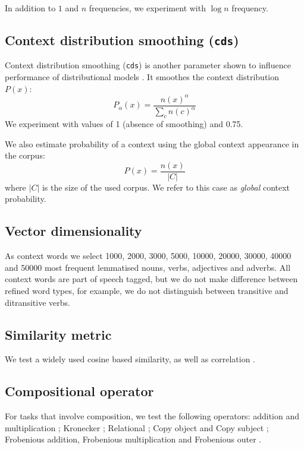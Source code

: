 \documentclass[11pt,letterpaper]{article}
\begin{document}
In addition to $1$ and $n$ frequencies, we experiment with $\log n$ frequency.

\subsection{Context distribution smoothing (\texttt{cds})}
\label{sec:cont-distr-smooth}

Context distribution smoothing (\texttt{cds}) is another parameter shown to influence performance of distributional models \cite{TACL570}. It smoothes the context distribution $P(x)$:
%
\begin{equation}
  \label{eq:cds}
  P_{\alpha}(x) = \frac{n(x)^{\alpha}}{\sum_{c}n(c)^{\alpha}}
\end{equation}
%
We experiment with values of 1 (absence of smoothing) and 0.75.

We also estimate probability of a context using the global context appearance in the corpus:
%
\begin{equation}
  \label{eq:cds-nan}
  P(x) = \frac{n(x)}{|C|}
\end{equation}
%
where $|C|$ is the size of the used corpus. We refer to this case as \textit{global} context probability.

\subsection{Vector dimensionality}
\label{sec:vect-dimens}

As context words we select 1000, 2000, 3000, 5000, 10000, 20000, 30000, 40000 and 50000 most frequent lemmatised nouns, verbs, adjectives and adverbs. All context words are part of speech tagged, but we do not make difference between refined word types, for example, we do not distinguish between transitive and ditransitive verbs.

\subsection{Similarity metric}
\label{sec:similarity-metric}

We test a widely used cosine based similarity, as well as correlation \cite{kiela-clark:2014:CVSC}.

\subsection{Compositional operator}
\label{sec:comp-oper}

For tasks that involve composition, we test the following operators: addition
and multiplication \cite{mitchell2010composition}; Kronecker \cite{Grefenstette:2011:ETV:2140490.2140497}; Relational \cite{Grefenstette:2011:ESC:2145432.2145580}; Copy object and Copy subject \cite{Kartsaklis12aunified}; Frobenious addition, Frobenious multiplication and Frobenious outer \cite{kartsadrqpl2014}.
\end{document}
